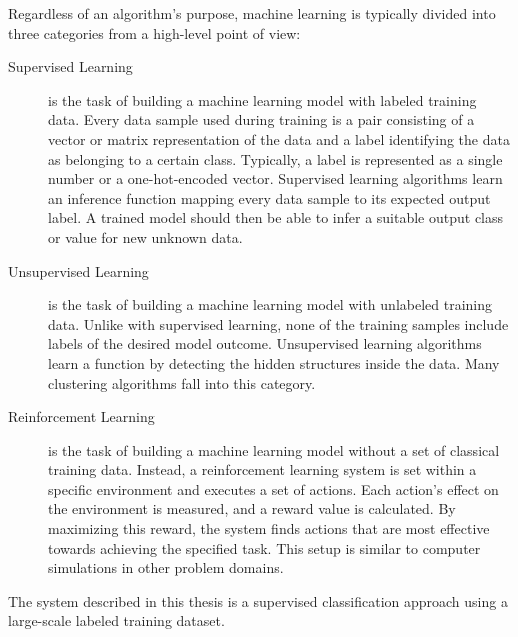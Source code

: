 Regardless of an algorithm's purpose, machine learning is typically divided into three categories from a high-level point of view:

	\begin{description}
		\item[Supervised Learning] is the task of building a machine learning model with labeled training data. Every data sample used during training is a pair consisting of a vector or matrix representation of the data and a label identifying the data as belonging to a certain class. Typically, a label is represented as a single number or a one-hot-encoded vector. Supervised learning algorithms learn an inference function mapping every data sample to its expected output label. A trained model should then be able to infer a suitable output class or value for new unknown data.

		\item[Unsupervised Learning] is the task of building a machine learning model with unlabeled training data. Unlike with supervised learning, none of the training samples include labels of the desired model outcome. Unsupervised learning algorithms learn a function by detecting the hidden structures inside the data. Many clustering algorithms fall into this category.

		\item[Reinforcement Learning] is the task of building a machine learning model without a set of classical training data. Instead, a reinforcement learning system is set within a specific environment and executes a set of actions. Each action's effect on the environment is measured, and a reward value is calculated. By maximizing this reward, the system finds actions that are most effective towards achieving the specified task. This setup is similar to computer simulations in other problem domains.
	\end{description}

The system described in this thesis is a supervised classification approach using a large-scale labeled training dataset.

